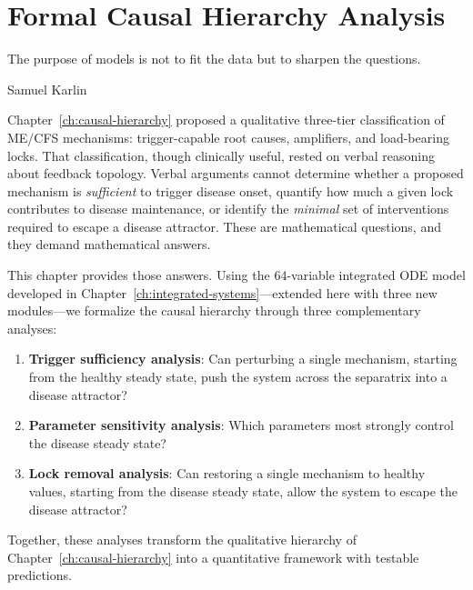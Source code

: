 \chapter{Formal Causal Hierarchy Analysis}
\label{ch:causal-hierarchy-formal}

\epigraph{The purpose of models is not to fit the data but to sharpen the questions.}{Samuel Karlin}

Chapter~\ref{ch:causal-hierarchy} proposed a qualitative three-tier classification of ME/CFS mechanisms: trigger-capable root causes, amplifiers, and load-bearing locks. That classification, though clinically useful, rested on verbal reasoning about feedback topology. Verbal arguments cannot determine whether a proposed mechanism is \emph{sufficient} to trigger disease onset, quantify how much a given lock contributes to disease maintenance, or identify the \emph{minimal} set of interventions required to escape a disease attractor. These are mathematical questions, and they demand mathematical answers.

This chapter provides those answers. Using the 64-variable integrated ODE model developed in Chapter~\ref{ch:integrated-systems}---extended here with three new modules---we formalize the causal hierarchy through three complementary analyses:

\begin{enumerate}
    \item \textbf{Trigger sufficiency analysis}: Can perturbing a single mechanism, starting from the healthy steady state, push the system across the separatrix into a disease attractor?
    \item \textbf{Parameter sensitivity analysis}: Which parameters most strongly control the disease steady state?
    \item \textbf{Lock removal analysis}: Can restoring a single mechanism to healthy values, starting from the disease steady state, allow the system to escape the disease attractor?
\end{enumerate}

Together, these analyses transform the qualitative hierarchy of Chapter~\ref{ch:causal-hierarchy} into a quantitative framework with testable predictions.

